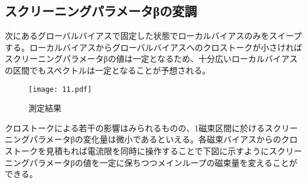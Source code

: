         \subsection{スクリーニングパラメータβの変調}
        次にあるグローバルバイアスで固定した状態でローカルバイアスのみをスイープする。ローカルバイアスからグローバルバイアスへのクロストークが小さければスクリーニングパラメータβの値は一定となるため、十分広いローカルバイアスの区間でもスペクトルは一定となることが予想される。
        \begin{figure}[H]
            \centering
            \texttt{[image: 11.pdf]}
            \caption{測定結果}
        \end{figure}
        クロストークによる若干の影響はみられるものの、1磁束区間に於けるスクリーニングパラメータβの変化量は微小であるといえる。各磁束バイアスからのクロストークを見積もれば電流限を同時に操作することで下図に示すようにスクリーニングパラメータβの値を一定に保ちつつメインループの磁束量を変えることができる。

